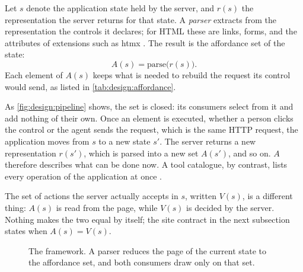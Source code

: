 Let $s$ denote the application state held by the server, and $r(s)$ the representation the server returns for that state.
A \emph{parser} extracts from the representation the controls it declares; for HTML these are links, forms, and the attributes of extensions such as htmx \cite{htmxlDocs}.
The result is the affordance set of the state:
\[
A(s) = \mathrm{parse}\bigl(r(s)\bigr).
\]
Each element of $A(s)$ keeps what is needed to rebuild the request its control would send, as listed in \autoref{tab:design:affordance}.

As \autoref{fig:design:pipeline} shows, the set is closed: its consumers select from it and add nothing of their own.
Once an element is executed, whether a person clicks the control or the agent sends the request, which is the same HTTP request, the application moves from $s$ to a new state $s'$.
The server returns a new representation $r(s')$, which is parsed into a new set $A(s')$, and so on.
$A$ therefore describes what can be done now. A tool catalogue, by contrast, lists every operation of the application at once \cite{openapi2021, mcpSpec2025}.

The set of actions the server actually accepts in $s$, written $V(s)$, is a different thing: $A(s)$ is read from the page, while $V(s)$ is decided by the server.
Nothing makes the two equal by itself; the site contract in the next subsection states when $A(s) = V(s)$.

\begin{figure}[htbp]
\centering
\resizebox{\textwidth}{!}{}
\caption{The framework. A parser reduces the page of the current state to the affordance set, and both consumers draw only on that set.}
\label{fig:design:pipeline}
\end{figure}

